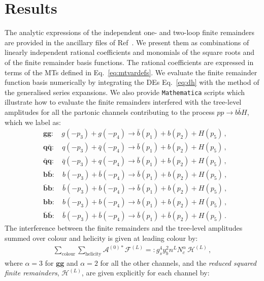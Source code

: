 \documentclass[main.tex]{subfiles}
\begin{document}
\section{Results}
\label{Hbbsec:results}
The analytic expressions of the independent one- and two-loop finite remainders are provided in the ancillary files of Ref~\cite{Badger:2021ega}. We present them as combinations of linearly independent rational coefficients and monomials of the square roots and of the finite remainder basis functions. The rational coefficients are expressed in terms of the MTs defined in Eq.~\ref{eq:mtvardefs}. We evaluate the finite remainder function basis numerically by integrating the DEs Eq.~\ref{eq:dh} with the method of the generalised series expansions. We also provide \texttt{Mathematica} scripts which illustrate how to evaluate the finite remainders interfered with the tree-level amplitudes for all the partonic channels contributing to the process $pp\to b\bar{b} H$, which we label as:
\begin{equation}
\label{eq:channel_definition}
\begin{aligned}
&\mathbf{gg}:       \quad  g(-p_3) + g(-p_4) \rightarrow \bar{b}(p_1) + b(p_2) + H(p_5) \,, \\
&\mathbf{q\bar{q}}: \quad  q(-p_3) + \bar{q}(-p_4) \rightarrow \bar{b}(p_1) + b(p_2) + H(p_5) \,, \\
&\mathbf{\bar{q}q}: \quad \bar{q}(-p_3) + q(-p_4) \rightarrow \bar{b}(p_1) + b(p_2) + H(p_5) \,, \\
&\mathbf{b\bar{b}}: \quad b(-p_3) + \bar{b}(-p_4) \rightarrow \bar{b}(p_1) + b(p_2) + H(p_5) \,, \\
&\mathbf{\bar{b}b}: \quad \bar{b}(-p_3) + b(-p_4) \rightarrow \bar{b}(p_1) + b(p_2) + H(p_5) \,, \\
&\mathbf{bb}: \quad b(-p_3) + b(-p_4) \rightarrow b(p_1) + b(p_2) + H(p_5) \,, \\
&\mathbf{\bar{b}\bar{b}}: \quad \bar{b}(-p_3) + \bar{b}(-p_4) \rightarrow \bar{b}(p_1) + \bar{b}(p_2) + H(p_5) \,.
\end{aligned}
\end{equation}
The interference between the finite remainders and the tree-level amplitudes summed over colour and helicity is given at leading colour by: 
\begin{align}
\sum_{\text{colour}} \sum_{\text{helicity}} \mathcal{A}^{(0) *} \mathcal{F}^{(L)} =: g_s^4 y_b^2 n^L N_c^{\alpha} \, \mathcal{H}^{(L)}\,,
\end{align}
where $\alpha=3$ for $\mathbf{gg}$ and $\alpha=2$ for all the other channels, and the \textit{reduced squared finite remainders}, $\mathcal{H}^{(L)}$, are given explicitly for each channel by:
\end{document}
